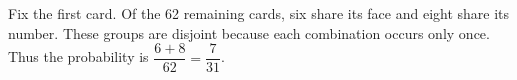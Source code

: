 Fix the first card. Of the 62 remaining cards, six share its face and eight share its number. These groups are disjoint because each combination occurs only once. Thus the probability is $\dfrac{6+8}{62}=\boxed{\dfrac{7}{31}}$.
